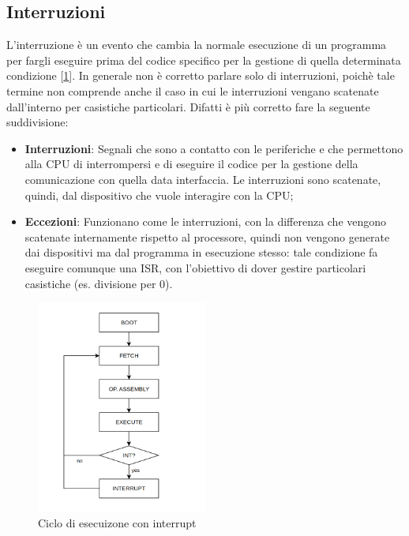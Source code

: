             

\subsection{Interruzioni}
L'interruzione è un evento che cambia la normale esecuzione di un programma per fargli eseguire prima del codice specifico per la gestione di quella determinata condizione [\ref{img:bootint}]. In generale non è corretto parlare solo di interruzioni, poichè tale termine non comprende anche il caso in cui le interruzioni vengano scatenate dall'interno per casistiche particolari. Difatti è più corretto fare la seguente suddivisione:
\begin{itemize}
    \item \textbf{Interruzioni}: Segnali che sono a contatto con le periferiche e che permettono alla CPU di interrompersi e di eseguire il codice per la gestione della comunicazione con quella data interfaccia. Le interruzioni sono scatenate, quindi, dal dispositivo che vuole interagire con la CPU;
    \item \textbf{Eccezioni}: Funzionano come le interruzioni, con la differenza che vengono scatenate internamente rispetto al processore, quindi non vengono generate dai dispositivi ma dal programma in esecuzione stesso: tale condizione fa eseguire comunque una ISR, con l'obiettivo di dover gestire particolari casistiche (es. divisione per 0).
\end{itemize}

\begin{figure}[ht]
    \centering
    \includegraphics[width=0.5\textwidth]{img/BootInt.png}
    \caption{Ciclo di esecuizone con interrupt}\label{img:bootint}
\end{figure}


